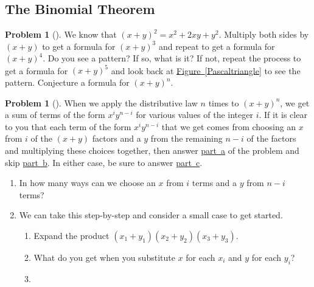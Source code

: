 \documentclass[10pt,]{book}
\theoremstyle{plain}
\theoremstyle{definition}
\newtheorem{activity}[project]{Problem}
\theoremstyle{definition}
\numberwithin{equation}{chapter}
\begin{document}
\subsection[{The Binomial Theorem}]{The Binomial Theorem}\label{subsection-8}
\begin{activity}[] \label{Conjecturebinomthm}
\hypertarget{p-323}{}%
We know that \((x+y)^2 = x^2+2xy+y^2\). Multiply both sides by \((x+y)\) to get a formula for \((x+y)^3\) and repeat to get a formula for \((x+y)^4\). Do you see a pattern? If so, what is it? If not, repeat the process to get a formula for \((x+y)^5\) and look back at \hyperref[Pascaltriangle]{Figure~\ref{Pascaltriangle}} to see the pattern. Conjecture a formula for \((x+y)^n\).%
\end{activity}
\begin{activity}[] \label{activity-54}
\hypertarget{p-328}{}%
When we apply the distributive law \(n\) times to \((x+y)^n\), we get a sum of terms of the form \(x^iy^{n-i}\) for various values of the integer \(i\). If it is clear to you that each term of the form \(x^iy^{n-i}\) that we get comes from choosing an \(x\) from \(i\) of the \((x+y)\) factors and a \(y\) from the remaining \(n-i\) of the factors and multiplying these choices together, then answer \hyperref[bin-thm-short]{part~a} of the problem and skip \hyperref[bin-thm-long]{part~b}. In either case, be sure to answer \hyperref[bin-thm-concl]{part~c}.%
\begin{enumerate}[font=\bfseries,label=(\alph*),ref=\alph*]
\item\label{bin-thm-short} \marginsymbol[-2.5em]{} \hypertarget{p-329}{}%
In how many ways can we choose an \(x\) from \(i\) terms and a \(y\) from \(n-i\) terms?%
\item\label{bin-thm-long} \marginsymbol[-2.5em]{} \hypertarget{p-331}{}%
We can take this step-by-step and consider a small case to get started.%
\begin{enumerate}[font=\bfseries,label=(\roman*),ref=\theenumi.\roman*]
\item\label{task-67} \marginsymbol[-2.5em]{} \hypertarget{p-332}{}%
Expand the product \((x_1 +y_1)(x_2 +y_2)(x_3+y_3)\).%
\item\label{task-68} \marginsymbol[-2.5em]{} \hypertarget{p-334}{}%
What do you get when you substitute \(x\) for each \(x_i\) and \(y\) for each \(y_i\)?%
\item\label{task-69} \marginsymbol[-2.5em]{} \hypertarget{p-336}{}%

\end{enumerate}
\end{enumerate}
\end{activity}
\end{document}

